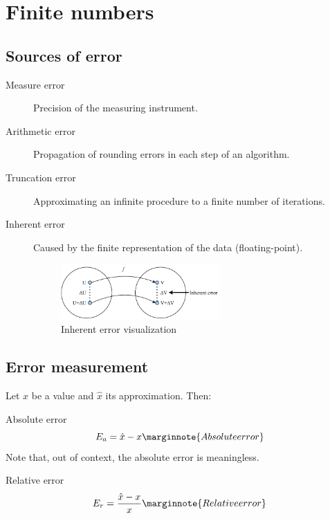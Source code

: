 \chapter{Finite numbers}



\section{Sources of error}

\begin{description}
    \item[Measure error] 
        Precision of the measuring instrument.

    \item[Arithmetic error] 
        Propagation of rounding errors in each step of an algorithm.

    \item[Truncation error] 
        Approximating an infinite procedure to a finite number of iterations.

    \item[Inherent error] 
        Caused by the finite representation of the data (floating-point).
        \begin{figure}[H]
            \centering
            \includegraphics[width=0.6\textwidth]{img/_inherent_error.pdf}
            \caption{Inherent error visualization}
        \end{figure}
\end{description}



\section{Error measurement}

Let $x$ be a value and $\hat{x}$ its approximation. Then:
\begin{descriptionlist}
    \item[Absolute error] 
        \[
            E_{a} = \hat{x} - x 
            \marginnote{Absolute error}
        \] 
        Note that, out of context, the absolute error is meaningless.
    \item[Relative error] 
        \[
            E_{r} = \frac{\hat{x} - x}{x} 
            \marginnote{Relative error}
        \] 
\end{descriptionlist}



